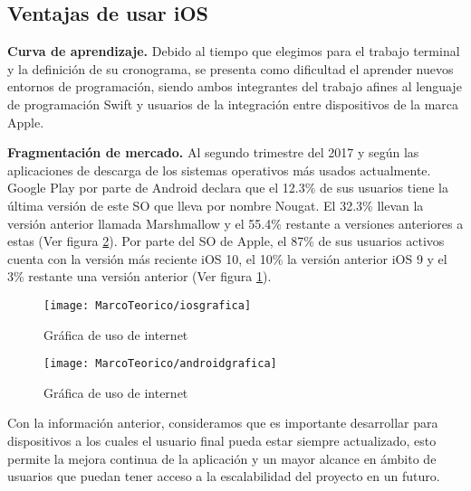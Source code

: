 	\subsection{Ventajas de usar iOS}

	\textbf{Curva de aprendizaje.}
	Debido al tiempo que elegimos para el trabajo terminal y la definición de su cronograma, se presenta como dificultad el aprender nuevos entornos de programación, siendo ambos integrantes del trabajo afines al lenguaje de programación Swift y usuarios de la integración entre dispositivos de la marca Apple.
	
	\textbf{Fragmentación de mercado.}
	Al segundo trimestre del 2017 y según las aplicaciones de descarga de los sistemas operativos más usados actualmente. Google Play por parte de Android declara que el 12.3\% de sus usuarios tiene la última versión de este SO que lleva por nombre Nougat. El 32.3\% llevan la versión anterior llamada Marshmallow y el 55.4\% restante a versiones anteriores a estas (Ver figura \ref{fig:graficaandroid}). \cite{10} Por parte del SO de Apple, el 87\% de sus usuarios activos cuenta con la versión más reciente iOS 10, el 10\% la versión anterior iOS 9 y el 3\% restante una versión anterior (Ver figura \ref{fig:graficaiost}). 
		\begin{figure}[ht]
		\centering
		\caption{Gráfica de uso de internet}
		\label{fig:graficaiost}
		\texttt{[image: MarcoTeorico/iosgrafica]}
	\end{figure}
\begin{figure}[ht]
	\centering
	\caption{Gráfica de uso de internet}
	\label{fig:graficaandroid}
	\texttt{[image: MarcoTeorico/androidgrafica]}
\end{figure}


	Con la información anterior, consideramos que es importante desarrollar para dispositivos a los cuales el usuario final pueda estar siempre actualizado, esto permite la mejora continua de la aplicación y un mayor alcance en ámbito de usuarios que puedan tener acceso a la escalabilidad del proyecto en un futuro.

